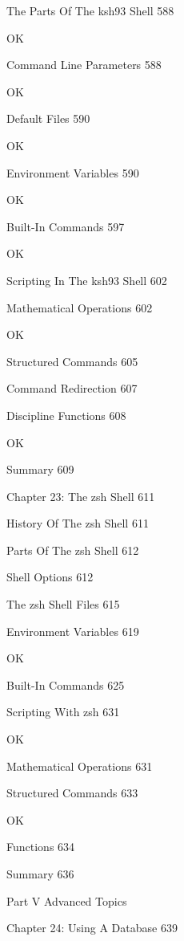 The Parts Of The ksh93 Shell 588

OK

Command Line Parameters 588

OK

Default Files 590

OK

Environment Variables 590

OK

Built-In Commands 597

OK

Scripting In The ksh93 Shell 602



Mathematical Operations 602

OK

Structured Commands 605



Command Redirection 607



Discipline Functions 608

OK

Summary 609



Chapter 23: The zsh Shell 611



History Of The zsh Shell 611



Parts Of The zsh Shell 612



Shell Options 612



The zsh Shell Files 615



Environment Variables 619

OK

Built-In Commands 625



Scripting With zsh 631

OK

Mathematical Operations 631



Structured Commands 633

OK

Functions 634



Summary 636



Part V Advanced Topics



Chapter 24: Using A Database 639

